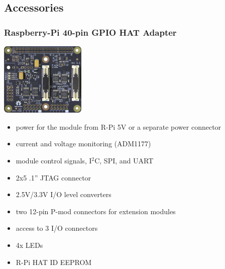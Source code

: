 \subsection{Accessories}

\begin{frame}
  \frametitle{Raspberry-Pi 40-pin GPIO HAT Adapter}
  \vspace{1cm}
  \begin{flushright}
    \includegraphics[angle=90, height=3.5cm]{hat-gmm7550.jpg}
  \end{flushright}
  \vspace{-6cm}

  \begin{minipage}{8cm}
  \begin{itemize}
  \item power for the module from R-Pi 5V or a separate power connector
  \item current and voltage monitoring (ADM1177)
  \item module control signals, I$^2$C, SPI, and UART
  \item 2x5 .1'' JTAG connector
  \item 2.5V/3.3V I/O level converters
  \item two 12-pin P-mod connectors for extension modules
  \item access to 3 I/O connectors
  \item 4x LEDs
  \item R-Pi HAT ID EEPROM
  \end{itemize}
  \end{minipage}
\end{frame}

